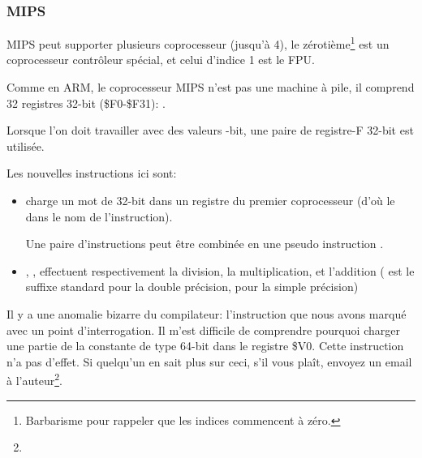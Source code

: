 \subsubsection{MIPS}

MIPS peut supporter plusieurs coprocesseur (jusqu'à 4), le zérotième\footnote{Barbarisme pour rappeler que les indices commencent à zéro.} est un coprocesseur
contrôleur spécial, et celui d'indice 1 est le FPU.

Comme en ARM, le coprocesseur MIPS n'est pas une machine à pile, il comprend 32 registres
32-bit (\$F0-\$F31):
.

Lorsque l'on doit travailler avec des valeurs -bit, une paire de registre-F
32-bit est utilisée.



Les nouvelles instructions ici sont:

\begin{itemize}

\item {} charge un mot de 32-bit dans un registre du premier coprocesseur
(d'où le  dans le nom de l'instruction).

Une paire d'instructions  peut être combinée en une pseudo instruction .

\item {}, ,  effectuent respectivement la division,
la multiplication, et l'addition ( est le suffixe standard pour la double précision,
 pour la simple précision)

\end{itemize}

\myindex{\CompilerAnomaly}
\label{MIPS_FPU_LUI}

Il y a une anomalie bizarre du compilateur: l'instruction  que nous avons
marqué avec un point d'interrogation.
Il m'est difficile de comprendre pourquoi charger une partie de la constante de type
64-bit \Tdouble dans le registre \$V0. Cette instruction n'a pas d'effet.
Si quelqu'un en sait plus sur ceci, s'il vous plaît, envoyez un email à l'auteur\footnote{\EMAIL}.

